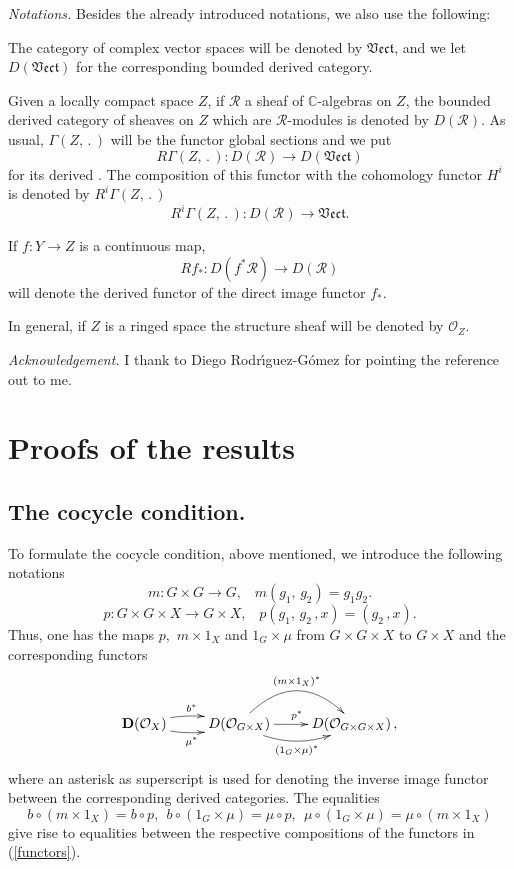 \documentclass[xypic,amscd,syntonly,amssymb,verbatim,12pt]{amsart}
\theoremstyle{plain}
\theoremstyle{definition}
\theoremstyle{remark}
\numberwithin{equation}{section}
\begin{document}
\smallskip

{\it Notations.} Besides the already introduced notations,  we
also use the following:

The category of complex vector spaces will be denoted by
$\mathfrak{Vect}$, and  we let $D(\mathfrak{Vect})$ for
the corresponding bounded derived category.

Given a locally compact space $Z$,
if ${\mathcal R}$ a sheaf of ${\mathbb C}$-algebras on $Z$, the bounded derived
category of sheaves
 on $Z$ which are ${\mathcal R}$-modules is denoted by $D({\mathcal R})$.
 As usual, $\Gamma(Z,\, . \,)$ will be the functor global sections and
we put
 $$R\Gamma(Z,\,.\,):D( {\mathcal R}) \to D(\mathfrak{Vect})$$
 for its derived \cite{Kas-Sch,Wei}.
 The composition of this functor with the cohomology functor $H^i$
 is denoted by $R^i\Gamma(Z,\,.\,)$
 $$R^i\Gamma(Z,\,.\,):D( {\mathcal R}) \to \mathfrak{Vect}.$$

If $f:Y\to Z$ is a continuous map,
$$Rf_*:D(f^{*}{\mathcal R})\to D({\mathcal R})$$
 will denote the derived
functor of the direct image functor $f_*$.

 In
general, if $Z$ is a ringed space  the structure sheaf will
be denoted by ${\mathcal O}_Z$.

\smallskip

{\it Acknowledgement.} I thank to Diego Rodr\'{\i}guez-G\'omez for
pointing  the reference \cite{Aspin} out to me.


\section{Proofs of the results}\label{Sect.Proofs}

\subsection {The cocycle condition.} \label{SusectCocycle} To
formulate the cocycle condition, above mentioned, we introduce the
following notations
$$m:  G\times G\to  G,\;\;\;m(g_1,\,g_2)=g_1g_2.$$
$$p:G\times G\times X\to G\times X,\;\;\; p(g_1,\,g_2\,,x)=(g_2\,,x).$$
Thus, one has the maps $p,$ $ m\times 1_X$ and $1_G\times \mu$
from $G\times G\times X$ to $G\times X$ and the corresponding functors
\begin{equation}\label{functors}
\xymatrix{{\mathbf D}({\mathcal O}_X)\ar@/^/[r]^{b^*}  \ar@/_/[r]_{\mu^*}  & D({\mathcal O}_{G\times X})   \ar[r]^{p^*} \ar@/_1pc/[r]_{(1_G\times \mu)^*} \ar@/^2pc/[r]^{(m\times 1_X)^*} & D({\mathcal O}_{G\times G\times X})\,,
}
\end{equation}
where an asterisk as superscript is used
for denoting  the inverse image functor between the corresponding
derived categories.
The equalities
$$b\circ(m\times 1_X)=b\circ p,\,\; b\circ(1_G\times\mu)=\mu\circ p,\,\; \mu\circ(1_G\times\mu)=\mu\circ(m\times 1_X)$$
give rise to equalities between the respective compositions of the functors in (\ref{functors}).
\end{document}
